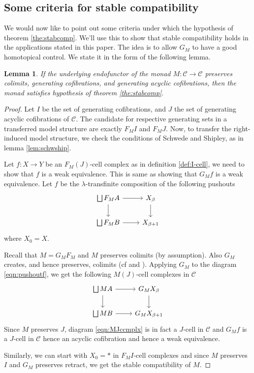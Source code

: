\documentclass{article}
\newcommand{\cC}{\mathcal{C}}
\newtheorem{lemma}[theorem]{Lemma}
\theoremstyle{definition}
\theoremstyle{remark}
\begin{document}
\subsection{Some criteria for stable compatibility}
We would now like to point out some criteria under which the hypothesis of theorem \ref{the:stabcomp}. We'll use this to show that stable compatibility holds in the applications stated in this paper. The idea is to allow $G_{M}$ to have a good homotopical control. We state it in the form of the following lemma.
\begin{lemma} \label{lem:cndforsc}
    If the underlying endofunctor of the monad $M:\cC \rightarrow \cC$ preserves colimits, generating cofibrations, and generating acyclic cofibrations, then the monad satisfies hypothesis of theorem \ref{the:stabcomp}.
\end{lemma}
\begin{proof}
Let $I$ be the set of generating cofibrations, and $J$ the set of generating acyclic cofibrations of $\cC$. The candidate for
respective generating sets in a transferred model structure are exactly $F_{M} I$ and $F_{M} J$. Now, to transfer the right-induced
model structure, we check the conditions of Schwede and Shipley, as in lemma \ref{lem:schwship}.

Let $f: X \rightarrow Y$ be an $F_{M}(J)$-cell complex as in definition \ref{def:I-cell}, we need to show that $f$ is a weak equivalence. This is same as showing that
$G_{M} f$ is a weak equivalence. Let $f$ be the $\lambda$-transfinite composition of the following pushouts
\begin{equation} \label{eqn:pushoutf}
    \begin{tikzcd}
       \bigsqcup F_{M}A \arrow{r} \arrow[swap]{d} & X_{\beta} \arrow{d} \\
        \bigsqcup F_{M}B \arrow{r} & X_{\beta +1}
     \end{tikzcd}
\end{equation} 
where $X_{0}=X$.

Recall that $M=G_{M}F_{M}$ and $M$ preserves colimits (by assumption). Also $G_M$ creates, and hence preserves, colimits (cf \cite[theorem 5.6.12]{MR4727501} and \cite{MR2178101}).
Applying $G_{M}$ to the diagram \eqref{eqn:pushoutf}, we get the following $M(J)$-cell complexes in $\cC$
\begin{equation} \label{eqn:MJccmplx}
    \begin{tikzcd}
       \bigsqcup MA \arrow{r} \arrow[swap]{d} & G_{M}X_{\beta} \arrow{d} \\
        \bigsqcup MB \arrow{r} & G_{M}X_{\beta +1}
\end{tikzcd}
\end{equation}
Since $M$ preserves $J$, diagram \eqref{eqn:MJccmplx} is in fact a $J$-cell in $\cC$
and $G_{M} f$ is a $J$-cell in $\cC$ hence an acyclic cofibration and hence a weak equivalence.

Similarly, we can start with $X_{0}=*$ in $F_{M}I$-cell complexes and since $M$ preserves $I$ and $G_{M}$ preserves retract, we get the stable
compatibility of $M$.
\end{proof}
\end{document}
